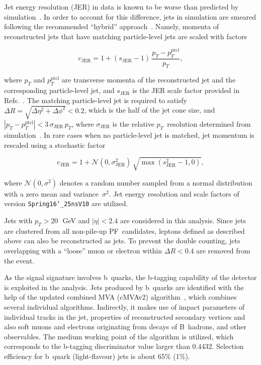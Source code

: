 Jet energy resolution (JER) in data is known to be worse than predicted by simulation~\cite{Khachatryan:2016kdb}.
In order to account for this difference, jets in simulation are smeared following the recommended ``hybrid'' approach~\cite{Wiki:JetResolution}.
Namely, momenta of reconstructed jets that have matching particle-level jets are scaled with factors
\begin{linenomath}
\begin{equation}
 c_\text{JER} = 1 + (s_\text{JER} - 1)\,\frac{p_{T} - p_{T}^\text{ptcl}}{p_{T}},
 \label{Eq:JER1}
\end{equation}
\end{linenomath}
where $p_{T}$ and $p_{T}^\text{ptcl}$ are transverse momenta of the reconstructed jet and the corresponding particle-level jet, and $s_\text{JER}$ is the JER scale factor provided in Refs.~\cite{Wiki:JetResolution, CMS-AN-16-351}.
The matching particle-level jet is required to satisfy $\Delta R = \sqrt{\Delta\eta^2 + \Delta\phi^2} < 0.2$, which is the half of the jet cone size, and $|p_{T} - p_{T}^\text{ptcl}| < 3\,\sigma_\text{JER}\,p_{T}$, where $\sigma_\text{JER}$ is the relative $p_{T}$~resolution determined from simulation~\cite{CMS-AN-16-116}.
In rare cases when no particle-level jet is matched, jet momentum is rescaled using a stochastic factor
\begin{linenomath}
\begin{equation}
 c_\text{JER} = 1 + \mathcal N(0, \sigma_\text{JER}^2)\,\sqrt{\max(s_\text{JER}^2 - 1, 0)},
 \label{Eq:JER2}
\end{equation}
\end{linenomath}
where $\mathcal N(0, \sigma^2)$ denotes a random number sampled from a normal distribution with a zero mean and variance~$\sigma^2$.
Jet energy resolution and scale factors of version \texttt{Spring16\char`_25nsV10} are utilized.

Jets with $p_{T} > 20$\,~GeV{} and $|\eta| < 2.4$ are considered in this analysis.
Since jets are clustered from all non-pile-up PF~candidates, leptons defined as described above can also be reconstructed as jets.
To prevent the double counting, jets overlapping with a ``loose'' muon or electron within $\Delta R < 0.4$ are removed from the event.

As the signal signature involves b~quarks, the b-tagging capability of the detector is exploited in the analysis.
Jets produced by b~quarks are identified with the help of the updated combined MVA (cMVAv2) algorithm~\cite{CMS-PAS-BTV-15-001}, which combines several individual algorithms.
Indirectly, it makes use of impact parameters of individual tracks in the jet, properties of reconstructed secondary vertices and also soft muons and electrons originating from decays of B~hadrons, and other observables.
The medium working point of the algorithm is utilized, which corresponds to the b-tagging discriminator value larger than 0.4432.
Selection efficiency for b~quark (light-flavour) jets is about 65\% (1\%).

